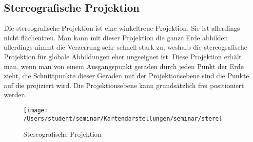 \subsection{Stereografische Projektion}
\label{sec:stereo}
Die stereografische Projektion ist eine winkeltreue Projektion. Sie ist allerdings nicht flächentreu.
Man kann mit dieser Projektion die ganze Erde abbilden allerdings nimmt die Verzerrung sehr schnell stark zu, weshalb die stereografische Projektion  für globale Abbildungen eher ungeeignet ist. Diese Projektion erhält man, wenn man von einem Ausgangspunkt geraden durch jeden Punkt der Erde zieht, die Schnittpunkte dieser Geraden mit der Projektionsebene sind die Punkte auf die projiziert wird.
Die Projektionsebene kann grundsätzlich frei positioniert werden.\\

\begin{figure}[hbtp]
\centering
\texttt{[image: /Users/student/seminar/Kartendarstellungen/seminar/stere]} \caption{Stereografische Projektion}
\end{figure}
\newpage 